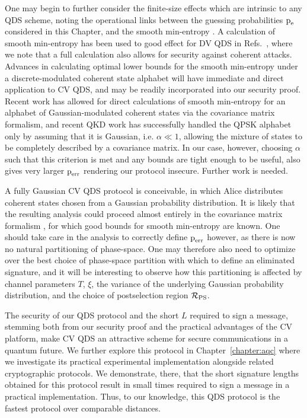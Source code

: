 One may begin to further consider the finite-size effects \cite{Tomamichel2016} which are intrinsic to any QDS scheme, noting the operational links between the guessing probabilities $\text{p}_{\text{e}}$ considered in this Chapter, and the smooth min-entropy \cite{Konig2009}. A calculation of smooth min-entropy has been used to good effect for DV QDS in Refs.~\cite{Amiri2016, Puthoor2016}, where we note that a full calculation also allows for security against coherent attacks. Advances in calculating optimal lower bounds for the smooth min-entropy under a discrete-modulated coherent state alphabet will have immediate and direct application to CV QDS, and may be readily incorporated into our security proof. Recent work \cite{Seshadreesan2017} has allowed for direct calculations of smooth min-entropy for an alphabet of Gaussian-modulated coherent states via the covariance matrix formalism, and recent QKD work \cite{Ghorai2019, Lin2019} has successfully handled the QPSK alphabet only by assuming that it is Gaussian, i.e. $\alpha \ll 1$, allowing the mixture of states to be completely described by a covariance matrix. In our case, however, choosing $\alpha$ such that this criterion is met and any bounds are tight enough to be useful, also gives very larger $\text{p}_{\text{err}}$ rendering our protocol insecure. Further work is needed.

A fully Gaussian CV QDS protocol is conceivable, in which Alice distributes coherent states chosen from a Gaussian probability distribution. It is likely that the resulting analysis could proceed almost entirely in the covariance matrix formalism \cite{Weedbrook2012, Serafini2018}, for which good bounds for smooth min-entropy are known. One should take care in the analysis to correctly define $\text{p}_{\text{err}}$ however, as there is now no natural partitioning of phase-space. One may therefore also need to optimize over the best choice of phase-space partition with which to define an eliminated signature, and it will be interesting to observe how this partitioning is affected by channel parameters $T$, $\xi$, the variance of the underlying Gaussian probability distribution, and the choice of postselection region $\mathcal{R}_{\text{PS}}$.


The security of our QDS protocol and the short $L$ required to sign a message, stemming both from our security proof and the practical advantages of the CV platform, make CV QDS an attractive scheme for secure communications in a quantum future. We further explore this protocol in Chapter~\ref{chapter:aqc} where we investigate its practical experimental implementation alongside related cryptographic protocols. We demonstrate, there, that the short signature lengths obtained for this protocol result in small times required to sign a message in a practical implementation. Thus, to our knowledge, this QDS protocol is the fastest protocol over comparable distances.

